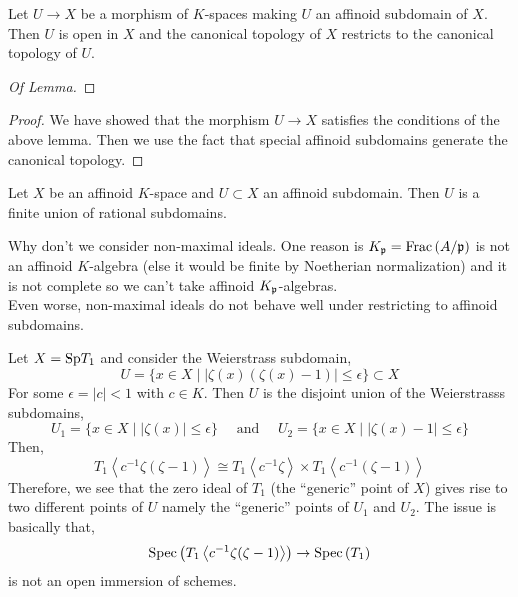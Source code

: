 \documentclass[12pt]{article}
\begin{document}
\begin{cor}
Let $U \to X$ be a morphism of $K$-spaces making $U$ an affinoid subdomain of $X$. Then $U$ is open in $X$ and the canonical topology of $X$ restricts to the canonical topology of $U$.
\end{cor}

\begin{proof}[Of Lemma]

\end{proof}

\begin{proof}
We have showed that the morphism $U \to X$ satisfies the conditions of the above lemma. Then we use the fact that special affinoid subdomains generate the canonical topology. 
\end{proof}

\begin{theorem}
Let $X$ be an affinoid $K$-space and $U \subset X$ an affinoid subdomain. Then $U$ is a finite union of rational subdomains. 
\end{theorem}

\begin{rmk}
Why don't we consider non-maximal ideals. One reason is $K_{\mathfrak{p}} = \mathrm{Frac}\left(A/\mathfrak{p}\right)$ is not an affinoid $K$-algebra (else it would be finite by Noetherian normalization) and it is not complete so we can't take affinoid $K_{\mathfrak{p}}$-algebras. 
\bigskip\\
Even worse, non-maximal ideals do not behave well under restricting to affinoid subdomains. 
\end{rmk}

\begin{example}
Let $X = \mathrm{Sp}{T_1}$ and consider the Weierstrass subdomain,
\[ U = \{ x \in X \mid |\zeta(x) (\zeta(x) - 1)| \le \epsilon \} \subset X \]
For some $\epsilon = |c| < 1$ with $c \in K$. Then $U$ is the disjoint union of the Weierstrasss subdomains,
\[ U_1 = \{ x \in X \mid |\zeta(x)| \le \epsilon \} \quad \text{ and } \quad U_2 = \{ x \in X \mid |\zeta(x) - 1| \le \epsilon \} \]
Then,
\[ T_1 \left< c^{-1} \zeta(\zeta - 1) \right> \cong T_1 \left< c^{-1} \zeta \right> \times T_1 \left< c^{-1} (\zeta - 1) \right> \]
Therefore, we see that the zero ideal of $T_1$ (the ``generic'' point of $X$) gives rise to two different points of $U$ namely the ``generic'' points of $U_1$ and $U_2$. The issue is basically that,
\[ \mathrm{Spec}\left(  T_1 \left< c^{-1} \zeta(\zeta - 1) \right>  \right) \to \mathrm{Spec}\left( T_1 \right) \]
is not an open immersion of schemes. 
\end{example}
\end{document}
